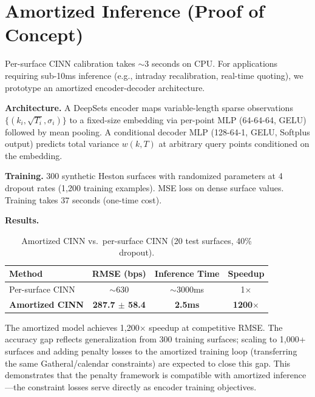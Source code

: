 \documentclass[11pt,a4paper]{article}
\begin{document}
\section{Amortized Inference (Proof of Concept)}
\label{app:amortized}

Per-surface CINN calibration takes ${\sim}$3 seconds on CPU. For applications requiring sub-10ms inference (e.g., intraday recalibration, real-time quoting), we prototype an amortized encoder-decoder architecture.

\textbf{Architecture.} A DeepSets encoder \citep{zaheer2017} maps variable-length sparse observations $\{(k_i, \sqrt{T_i}, \sigma_i)\}$ to a fixed-size embedding via per-point MLP (64-64-64, GELU) followed by mean pooling. A conditional decoder MLP (128-64-1, GELU, Softplus output) predicts total variance $w(k, T)$ at arbitrary query points conditioned on the embedding.

\textbf{Training.} 300 synthetic Heston surfaces with randomized parameters at 4 dropout rates (1,200 training examples). MSE loss on dense surface values. Training takes 37 seconds (one-time cost).

\textbf{Results.}

\begin{table}[h]
\centering
\caption{Amortized CINN vs.\ per-surface CINN (20 test surfaces, 40\% dropout).}
\label{tab:amortized}
\begin{tabular}{lccc}
\toprule
\textbf{Method} & \textbf{RMSE (bps)} & \textbf{Inference Time} & \textbf{Speedup} \\
\midrule
Per-surface CINN & ${\sim}$630 & ${\sim}$3000ms & 1$\times$ \\
\textbf{Amortized CINN} & \textbf{287.7 $\pm$ 58.4} & \textbf{2.5ms} & \textbf{1200$\times$} \\
\bottomrule
\end{tabular}
\end{table}

The amortized model achieves 1,200$\times$ speedup at competitive RMSE. The accuracy gap reflects generalization from 300 training surfaces; scaling to 1,000+ surfaces and adding penalty losses to the amortized training loop (transferring the same Gatheral/calendar constraints) are expected to close this gap. This demonstrates that the penalty framework is compatible with amortized inference---the constraint losses serve directly as encoder training objectives.

\end{document}
